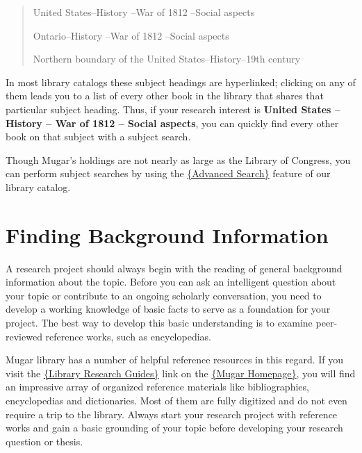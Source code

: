 \begin{quote}
United States--History --War of 1812 --Social aspects

Ontario--History --War of 1812 --Social aspects

Northern boundary of the United States--History--19th century
\end{quote}

In most library catalogs these subject headings are hyperlinked; clicking on 
any of them leads you to a list of every other book in the library that shares 
that particular subject heading. Thus, if your research interest is 
\textbf{United States -- History -- War of 1812 -- Social aspects}, you can 
quickly find every other book on that subject with a subject search. 

Though Mugar's holdings are not nearly as large as the Library of Congress, you 
can perform subject searches by using the 
\href{http://buprimo.hosted.exlibrisgroup.com:1701/primo_library/libweb/action/s
earch.do?dscnt=1&scp.scps=scope%
ral_multiple_fe&tab=default_tab&dstmp=1359630002248&vid=BU&mode=Advanced&fromLog
in=true}{\{Advanced Search\}} feature of our library catalog.

\section{Finding Background Information}

A research project should always begin with the reading of general background 
information about the topic. Before you can ask an intelligent question about 
your topic or contribute to an ongoing scholarly conversation, you need to 
develop a working knowledge of basic facts to serve as a foundation for your 
project. The best way to develop this basic understanding is to examine 
peer-reviewed reference works, such as encyclopedias.

Mugar library has a number of helpful reference resources in this regard. If 
you visit the 
\href{http://www.bu.edu/library/research/guides/research-guides}{\{Library 
Research Guides\}} link on the \href{http://www.bu.edu/library}{\{Mugar 
Homepage\}}, you will find an impressive array of organized reference materials 
like bibliographies, encyclopedias and dictionaries. Most of them are fully 
digitized and do not even require a trip to the library. Always start your 
research project with reference works and gain a basic grounding of your topic 
before developing your research question or thesis.

